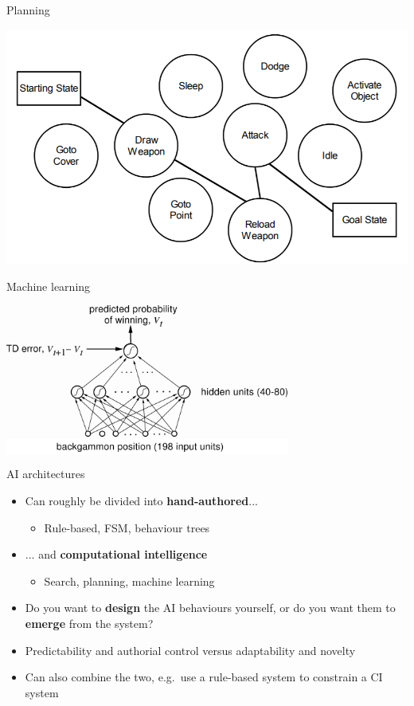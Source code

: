 \begin{frame}{Planning}
	\begin{center}
		\includegraphics[width=\textwidth]{goap}
	\end{center}
\end{frame}

\begin{frame}{Machine learning}
	\begin{center}
		\colorbox{white}{
			\includegraphics[width=0.7\textwidth]{tdgammon}
		}
	\end{center}
\end{frame}

\begin{frame}{AI architectures}
	\begin{itemize}
		\pause\item Can roughly be divided into \textbf{hand-authored}...
			\begin{itemize}
				\pause\item Rule-based, FSM, behaviour trees
			\end{itemize}
		\pause\item ... and \textbf{computational intelligence}
			\begin{itemize}
				\pause\item Search, planning, machine learning
			\end{itemize}
		\pause\item Do you want to \textbf{design} the AI behaviours yourself,
			or do you want them to \textbf{emerge} from the system?
		\pause\item Predictability and authorial control versus adaptability and novelty
		\pause\item Can also combine the two, e.g.\ use a rule-based system to constrain a CI system
	\end{itemize}
\end{frame}

